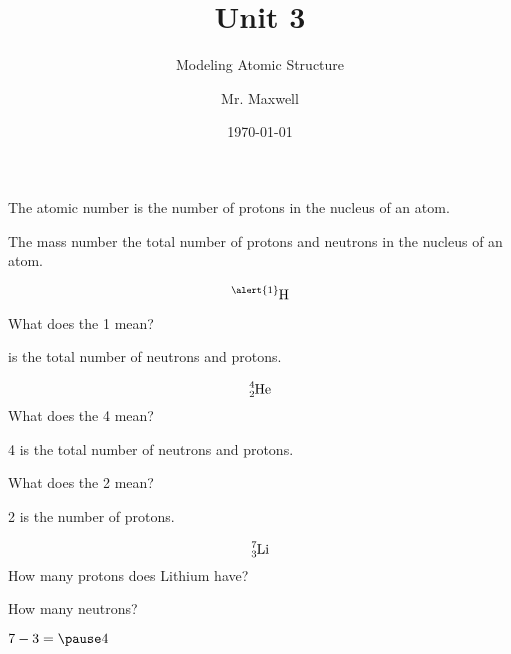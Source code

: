 \documentclass{beamer}
\title{Unit 3}
\subtitle{Modeling Atomic Structure}
\author{Mr. Maxwell}
\institute{PACS}
\date{\today}
\begin{document}
\frame{\titlepage}


\begin{frame}

\onslide The 
 \pause \alert{atomic number}
 \onslide is the number of 
 \pause \alert{protons} 
 \onslide in the nucleus of an atom.
\end{frame}


\begin{frame}
    \onslide The 
     \pause \alert{mass number}
     \onslide the total number of
     \pause \alert{protons} 
     \onslide and
     \pause \alert{neutrons} 
     \onslide in the nucleus of an atom.
    \end{frame}

\begin{frame}
    $$\ce{^{\alert{1}}_{}H}$$

    \pause What does the \alert{1} mean?

     is the total number of neutrons and protons.
\end{frame}


\begin{frame}
 $$\ce{^{4}_{2}He}$$
    \pause What does the \alert{4} mean?

    \pause \alert{4} is the total number of neutrons and protons.

    \pause What does the \alert{2} mean?

    \pause \alert{2} is the number of protons.
\end{frame}

\begin{frame}
 $$\ce{^{7}_{3}Li}$$
    \pause How many protons does Lithium have?


    \pause How many neutrons?

    \pause $7 - 3 = \pause 4 $

\end{frame}
\end{document}
